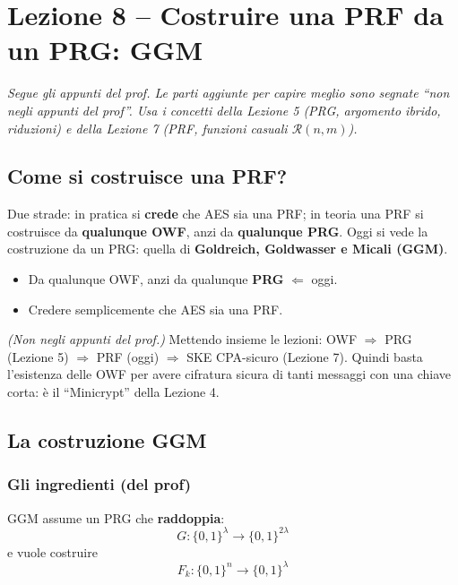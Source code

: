 \chapter{Lezione 8 -- Costruire una PRF da un PRG: GGM}

\emph{Segue gli appunti del prof. Le parti aggiunte per capire meglio sono segnate ``non negli appunti del prof''. Usa i concetti della Lezione 5 (PRG, argomento ibrido, riduzioni) e della Lezione 7 (PRF, funzioni casuali \(\mathcal{R}(n, m)\)).}

\section{Come si costruisce una PRF?}

\begin{inbreve}
Due strade: in pratica si \textbf{crede} che AES sia una PRF; in teoria una PRF si costruisce da \textbf{qualunque OWF}, anzi da \textbf{qualunque PRG}. Oggi si vede la costruzione da un PRG: quella di \textbf{Goldreich, Goldwasser e Micali (GGM)}.
\end{inbreve}

\begin{itemize}
  \item Da qualunque OWF, anzi da qualunque \textbf{PRG} \(\Leftarrow\) oggi.
  \item Credere semplicemente che AES sia una PRF.
\end{itemize}

\begin{nota}
\emph{(Non negli appunti del prof.)} Mettendo insieme le lezioni: OWF \(\Rightarrow\) PRG (Lezione 5) \(\Rightarrow\) PRF (oggi) \(\Rightarrow\) SKE CPA-sicuro (Lezione 7). Quindi basta l'esistenza delle OWF per avere cifratura sicura di tanti messaggi con una chiave corta: è il ``Minicrypt'' della Lezione 4.
\end{nota}

\section{La costruzione GGM}

\subsection{Gli ingredienti (del prof)}

GGM assume un PRG che \textbf{raddoppia}:
\[
G : \{0,1\}^\lambda \to \{0,1\}^{2\lambda}
\]
e vuole costruire
\[
F_k : \{0,1\}^n \to \{0,1\}^\lambda
\]

